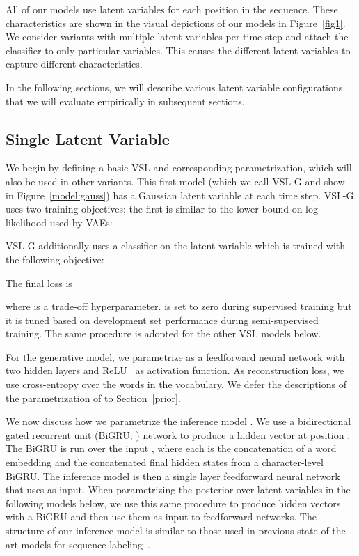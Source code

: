 \documentclass[11pt,a4paper]{article}
\newcommand{\vsmg}{VSL-G\xspace}
\begin{document}
All of our models use latent variables for each position in the sequence. These characteristics are shown in the visual depictions of our models in Figure~\ref{fig1}.
We consider variants with multiple latent variables per time step and attach the classifier to only particular variables. This causes the different latent variables to capture different characteristics.

In the following sections, we will describe various latent variable configurations that we will evaluate empirically in subsequent sections.

\subsection{Single Latent Variable}

We begin by defining a basic VSL and corresponding parametrization, which will also be used in other variants. This first model (which we call \vsmg and show in Figure~\ref{model:gauss}) has a Gaussian latent variable at each time step. \vsmg uses two training objectives; the first is similar to the lower bound on log-likelihood used by VAEs:



\noindent \vsmg additionally uses a classifier  on the latent variable  which is trained with the following objective:


\noindent The final loss is

where  is a trade-off hyperparameter.  is set to zero during supervised training but it is tuned based on development set performance during semi-supervised training. The same procedure is adopted for the other VSL models below.

For the generative model, we parametrize  as a feedforward neural network with two hidden layers and ReLU~\cite{nair2010rectified}
as activation function. As reconstruction loss, we use cross-entropy over the words in the vocabulary.
We defer the descriptions of the parametrization of  to Section~\ref{prior}.

We now discuss how we parametrize the inference model .
We use a bidirectional gated recurrent unit (BiGRU; \citealp{chung2014empirical}) network to produce a  hidden vector  at position . The BiGRU is run over the input , where each  is the concatenation of a word embedding and the concatenated final hidden states from a character-level BiGRU.
The inference model  is then a single layer feedforward neural network that uses  as input.
When parametrizing the posterior over latent variables in the following models below, we use this same procedure to produce hidden vectors with a BiGRU and then use them as input to feedforward networks. The structure of our inference model is similar to those used in previous state-of-the-art models for sequence labeling~\cite{lample2016neural,yang2017transfer}.
\end{document}
